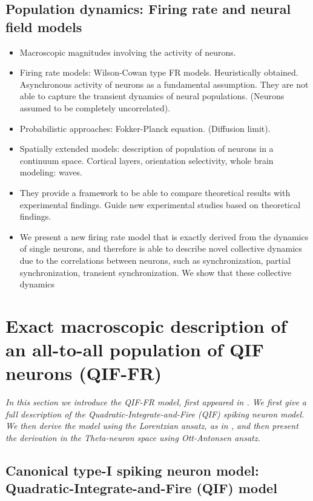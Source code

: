 \subsection{Population dynamics: Firing rate and neural field models}

\begin{itemize}
\item Macroscopic magnitudes involving the activity of neurons.
\item Firing rate models: Wilson-Cowan type FR models. Heuristically
  obtained. Asynchronous activity of neurons as a fundamental
  assumption. They are not able to capture the transient dynamics of
  neural populations. (Neurons assumed to be completely uncorrelated).
\item Probabilistic approaches: Fokker-Planck equation. (Diffusion
  limit).
\item Spatially extended models: description of population of neurons
  in a continuum space. Cortical layers, orientation selectivity,
  whole brain modeling: waves.
\item They provide a framework to be able to compare theoretical
  results with experimental findings. Guide new experimental studies
  based on theoretical findings. 
\item We present a new firing rate model that is exactly derived from
  the dynamics of single neurons, and therefore is able to describe
  novel collective dynamics due to the correlations between neurons,
  such as synchronization, partial synchronization, transient
  synchronization. We show that these collective dynamics 
\end{itemize}


\section{Exact macroscopic description of an all-to-all population of
  QIF neurons (QIF-FR)}

\textit{\color{red} In this section we introduce the QIF-FR model,
  first appeared in \cite{Montbrio2015}. We first give a full
  description of the Quadratic-Integrate-and-Fire (QIF) spiking neuron
model. We then derive the model using the Lorentzian ansatz, as in
\cite{Montbrio2015}, and then present the derivation in the
Theta-neuron space using Ott-Antonsen ansatz.}



\subsection{\sloppy Canonical type-I spiking neuron model:
  Quadratic-Integrate-and-Fire (QIF) model}

